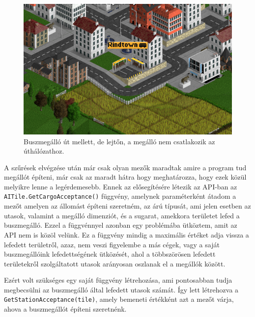 \begin{figure} [h!]
	\centering
	\includegraphics[width=\textwidth]{images/lejtomegallo.png}
	\caption{Buszmegálló út mellett, de lejtőn, a megálló nem csatlakozik az úthálózathoz.}
	\label{fig:lejtomegallo}
\end{figure}

A szűrések elvégzése után már csak olyan mezők maradtak amire a program tud megállót építeni, már csak az maradt hátra hogy meghatározza, hogy ezek közül melyikre lenne a legérdemesebb. Ennek az elősegítésére létezik az API-ban az \\ \texttt{AITile.GetCargoAcceptance()} függvény, amelynek paraméterként átadom a mezőt amelyen az állomást építeni szeretném, az árú típusát, ami jelen esetben az utasok, valamint a megálló dimenziót, és a sugarat, amekkora területet lefed a buszmegálló. Ezzel a függvénnyel azonban egy problémába ütköztem, amit az API nem is közöl velünk. Ez a függvény mindig a maximális értéket adja vissza a lefedett területről, azaz, nem veszi figyelembe a más cégek, vagy a saját buszmegállóink lefedettségének ütközését, ahol a többszörösen lefedett területekről szolgáltatott utasok arányosan oszlanak el a megállók között.

Ezért volt szükséges egy saját függvény létrehozása, ami pontosabban tudja megbecsülni az buszmegálló által lefedett utasok számát. Így lett létrehozva a \\ \texttt{GetStationAcceptance(tile)}, amely bemeneti értékként azt a mezőt várja, ahova a buszmegállót építeni szeretnénk.

